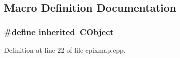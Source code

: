 \subsection{Macro Definition Documentation}
\subsubsection[{inherited}]{\setlength{\rightskip}{0pt plus 5cm}\#define inherited~C\+Object}\label{cpixmap_8cpp_a3920e3b7cb0909b941b2409493acf8f1}


Definition at line 22 of file cpixmap.\+cpp.

